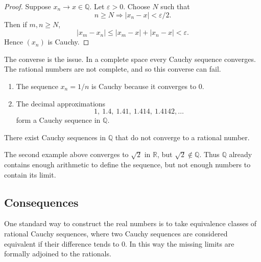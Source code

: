 \begin{proof}
Suppose $x_n\to x\in\mathbb{Q}$.  Let $\varepsilon>0$.  Choose $N$ such that
\[
n\ge N \Rightarrow |x_n-x|<\varepsilon/2.
\]
Then if $m,n\ge N$,
\[
|x_m-x_n|\le |x_m-x|+|x_n-x|<\varepsilon.
\]
Hence $(x_n)$ is Cauchy.
\end{proof}

\begin{remark}
The converse is the issue.  In a complete space every Cauchy sequence converges.  The rational
numbers are not complete, and so this converse can fail.
\end{remark}

\begin{remark}[Examples]
\begin{enumerate}
  \item The sequence $x_n=1/n$ is Cauchy because it converges to $0$.
  \item The decimal approximations
  \[
  1,\ 1.4,\ 1.41,\ 1.414,\ 1.4142,\dots
  \]
  form a Cauchy sequence in $\mathbb{Q}$.
\end{enumerate}
\end{remark}

\begin{theorem}
\label{thm:cauchy-not-convergent-q}
There exist Cauchy sequences in $\mathbb{Q}$ that do not converge to a rational number.
\end{theorem}

\begin{remark}
The second example above converges to $\sqrt{2}$ in $\mathbb{R}$, but $\sqrt{2}\notin\mathbb{Q}$.  Thus
$\mathbb{Q}$ already contains enough arithmetic to define the sequence, but not enough numbers to
contain its limit.
\end{remark}

\subsection{Consequences}

\begin{remark}
\label{rem:real-motivation}
One standard way to construct the real numbers is to take equivalence classes of rational Cauchy
sequences, where two Cauchy sequences are considered equivalent if their difference tends to $0$.
In this way the missing limits are formally adjoined to the rationals.
\end{remark}
